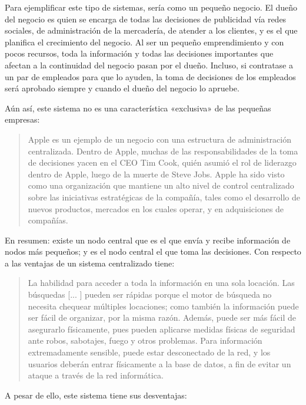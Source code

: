 \documentclass[12pt,a4paper,twoside]{book}
\begin{document}
Para ejemplificar este tipo de sistemas, sería como un pequeño negocio. El dueño del negocio es quien se encarga de todas las decisiones de publicidad vía redes sociales, de administración de la mercadería, de atender a los clientes, y es el que planifica el crecimiento del negocio. Al ser un pequeño emprendimiento y con pocos recursos, toda la información y todas las decisiones importantes que afectan a la continuidad del negocio pasan por el dueño. Incluso, si contratase a un par de empleados para que lo ayuden, la toma de decisiones de los empleados será aprobado siempre y cuando el dueño del negocio lo apruebe.

Aún así, este sistema no es una característica «exclusiva» de las pequeñas empresas:

\begin{quotation}
Apple es un ejemplo de un negocio con una estructura de administración centralizada. Dentro de Apple, muchas de las responsabilidades de la toma de decisiones yacen en el CEO Tim Cook, quién asumió el rol de liderazgo dentro de Apple, luego de la muerte de Steve Jobs. Apple ha sido visto como una organización que mantiene un alto nivel de control centralizado sobre las iniciativas estratégicas de la compañía, tales como el desarrollo de nuevos productos, mercados en los cuales operar, y en adquisiciones de compañías. \cite[pág. 460]{sist:openstax}
\end{quotation}

En resumen: existe un nodo central que es el que envía y recibe información de nodos más pequeños; y es el nodo central el que toma las decisiones. Con respecto a las ventajas de un sistema centralizado tiene:

\begin{quotation}
La habilidad para acceder a toda la información en una sola locación. Las búsquedas [... ] pueden ser rápidas porque el motor de búsqueda no necesita chequear múltiples locaciones; como también la información puede ser fácil de organizar, por la misma razón. Además, puede ser más fácil de asegurarlo físicamente, pues pueden aplicarse medidas físicas de seguridad ante robos, sabotajes, fuego y otros problemas. Para información extremadamente sensible, puede estar desconectado de la red, y los usuarios deberán entrar físicamente a la base de datos, a fin de evitar un ataque a través de la red informática. \cite{sist:central}
\end{quotation}

A pesar de ello, este sistema tiene sus desventajas:
\end{document}
